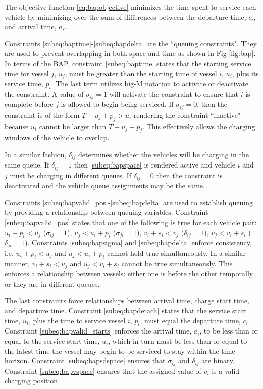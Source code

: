 \documentclass[letterpaper, 10pt, conference]{IEEEtran}
\begin{document}
The objective function \eqref{eq:bapobjective} minimizes the time spent to service each vehicle by minimizing over the sum of differences between the departure time, $c_i$, and arrival time, $a_i$.

Constraints \ref{subeq:baptime}-\ref{subeq:bapdelta} are the ``queuing constraints". They are used to prevent overlapping in both space and time as shown in Fig \ref{fig:bap}. In terms of the BAP, constraint \eqref{subeq:baptime} states that the starting service time for vessel $j$, $u_j$, must be greater than the starting time of vessel $i$, $u_i$, plus its service time, $p_i$. The last term utilizes big-M notation to activate or deactivate the constraint. A value of $\sigma_{ij} = 1$ will activate the constraint to ensure that $i$ is complete before $j$ is allowed to begin being serviced. If $\sigma_{ij} = 0$, then the constraint is of the form $T + u_j + p_j > u_i$ rendering the constraint ``inactive" because $u_i$ cannot be larger than $T + u_j + p_j$. This effectively allows the charging windows of the vehicle to overlap.

In a similar fashion, $\delta_{ij}$ determines whether the vehicles will be charging in the same queue. If $\delta_{ij} = 1$ then \eqref{subeq:bapspace} is rendered active and vehicle $i$ and $j$ must be charging in different queues. If $\delta_{ij} = 0$ then the constraint is deactivated and the vehicle queue assignments may be the same.

Constraints \ref{subeq:bapvalid_pos}-\ref{subeq:bapdelta} are used to establish queuing by providing a relationship between queuing variables. Constraint \eqref{subeq:bapvalid_pos} states that one of the following is true for each vehicle pair: $u_i + p_i < u_j$ ($\sigma_{ij} = 1$), $u_j < u_i + p_i$ ($\sigma_{ji} = 1$), $v_i + s_i < v_j$ ($\delta_{ij} = 1$), $v_j < v_i + s_i$ ($\delta_{ji} = 1$). Constraints \eqref{subeq:bapsigma} and \eqref{subeq:bapdelta} enforce consistency, i.e. $u_i + p_i < u_j$ and $u_j < u_i + p_i$ cannot hold true simultaneously. In a similar manner, $v_i + s_i < u_j$ and $u_j < v_i + s_i$ cannot be true simultaneously. This enforces a relationship between vessels: either one is before the other temporally or they are in different queues.

The last constraints force relationships between arrival time, charge start time, and departure time. Constraint \eqref{subeq:bapdetach} states that the service start time, $u_i$, plus the time to service vessel $i$, $p_i$, must equal the departure time, $c_i$. Constraint \eqref{subeq:bapvalid_starts} enforces the arrival time, $a_i$, to be less than or equal to the service start time, $u_i$, which in turn must be less than or equal to the latest time the vessel may begin to be serviced to stay within the time horizon. Constraint \eqref{subeq:bapsdspace} ensures that $\sigma_{ij}$ and $\delta_{ij}$ are binary. Constraint \eqref{subeq:bapvspace} ensures that the assigned value of $v_i$ is a valid charging position.
\end{document}
